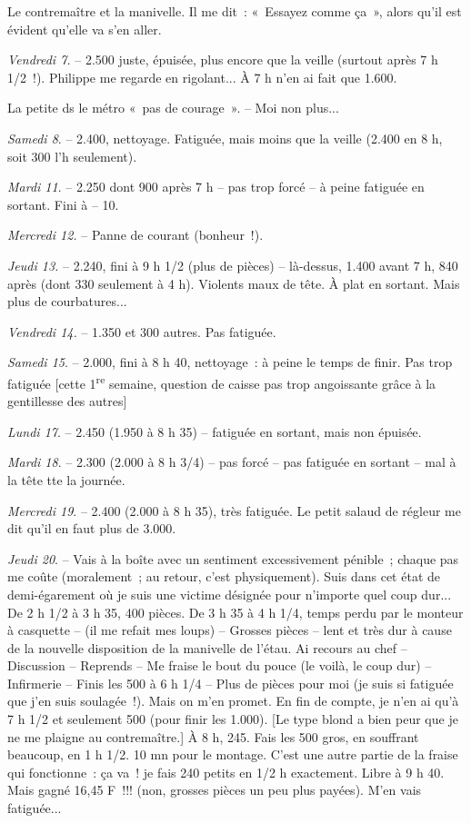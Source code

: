 \documentclass[french,twoside]{book} %
\begin{document}
\par
Le contremaître et la manivelle. Il me dit : « Essayez comme ça », alors qu'il est évident qu'elle va s'en aller.\par
{\itshape Vendredi 7.} – 2.500 juste, épuisée, plus encore que la veille (surtout après 7 h 1/2 !). Philippe me regarde en rigolant... À 7 h n'en ai fait que 1.600.\par
La petite ds le métro « pas de courage ». – Moi non plus...\par
{\itshape Samedi 8}. – 2.400, nettoyage. Fatiguée, mais moins que la veille (2.400 en 8 h, soit 300 l'h seulement).\par
{\itshape Mardi 11}. – 2.250 dont 900 après 7 h – pas trop forcé – à peine fatiguée en sortant. Fini à – 10.\par
{\itshape Mercredi 12.} – Panne de courant (bonheur !).\par
{\itshape Jeudi 13.} – 2.240, fini à 9 h 1/2 (plus de pièces) – là-dessus, 1.400 avant 7 h, 840 après (dont 330 seulement à 4 h). Violents maux de tête. À plat en sortant. Mais plus de courbatures...\par
{\itshape Vendredi 14.} – 1.350 et 300 autres. Pas fatiguée.\par
{\itshape Samedi 15}. – 2.000, fini à 8 h 40, nettoyage : à peine le temps de finir. Pas trop fatiguée [cette 1\textsuperscript{re} semaine, question de caisse pas trop angoissante grâce à la gentillesse des autres]\par
[{\itshape Dimanche.} – Maux de tête, nuit de dimanche à lundi pas dormi.]\par
{\itshape Lundi 17}. – 2.450 (1.950 à 8 h 35) – fatiguée en sortant, mais non épuisée.\par
{\itshape Mardi 18}. – 2.300 (2.000 à 8 h 3/4) – pas forcé – pas fatiguée en sortant – mal à la tête tte la journée.\par
{\itshape Mercredi 19}. – 2.400 (2.000 à 8 h 35), très fatiguée. Le petit salaud de régleur me dit qu'il en faut plus de 3.000.\par
{\itshape Jeudi 20}. – Vais à la boîte avec un sentiment excessivement pénible ; chaque pas me coûte (moralement ; au retour, c'est physiquement). Suis dans cet état de demi-égarement où je suis une victime désignée pour n'importe quel coup dur... De 2 h 1/2 à 3 h 35, 400 pièces. De 3 h 35 à 4 h 1/4, temps perdu par le monteur à casquette – (il me refait mes loups) – Grosses pièces – lent et très dur à cause de la nouvelle disposition de la manivelle de l'étau. Ai recours au chef – Discussion – Reprends – Me fraise le bout du pouce (le voilà, le coup dur) – Infirmerie – Finis les 500 à 6 h 1/4 – Plus de pièces pour moi (je suis si fatiguée que j'en suis soulagée !). Mais on m'en promet. En fin de compte, je n'en ai qu'à 7 h 1/2 et seulement 500 (pour finir les 1.000). [Le type blond a bien peur que je ne me plaigne au contremaître.] À 8 h, 245. Fais les 500 gros, en souffrant beaucoup, en 1 h 1/2. 10 mn pour le montage. C'est une autre partie de la fraise qui fonctionne : ça va ! je fais 240 petits en 1/2 h exactement. Libre à 9 h 40. Mais gagné 16,45 F !!! (non, grosses pièces un peu plus payées). M'en vais fatiguée...\par
\end{document}
